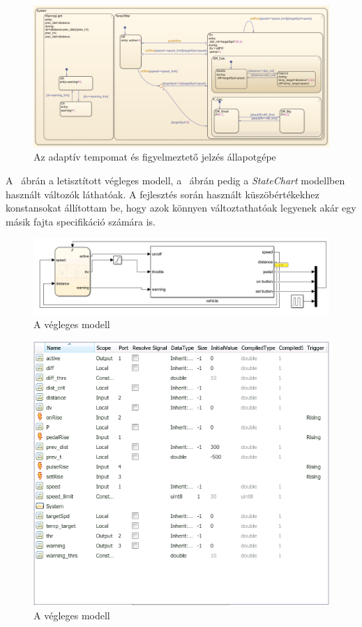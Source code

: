 \begin{figure}[!ht]
	\centering
	\includegraphics[width=\textwidth,keepaspectratio]{figures/2m04/f2_chart_4.png}
	\caption{Az adaptív tempomat és figyelmeztető jelzés állapotgépe}
	\label{fig:chart3}
\end{figure}

A ~ábrán a letisztított végleges modell, a ~ábrán pedig a \textit{StateChart} modellben használt változók láthatóak. A fejlesztés során használt küszöbértékekhez konstansokat állítottam be, hogy azok könnyen változtathatóak legyenek akár egy másik fajta specifikáció számára is.


\begin{figure}[!ht]
\centering
	\includegraphics[width=120mm,keepaspectratio]{figures/2m04/f2_model_4.png}
\caption{A végleges modell}
\label{fig:model3}
\end{figure}

\begin{figure}[!ht]
	\centering
	\includegraphics[width=120mm,keepaspectratio]{figures/2m04/variables.png}
	\caption{A végleges modell}
	\label{fig:variables}
\end{figure}
